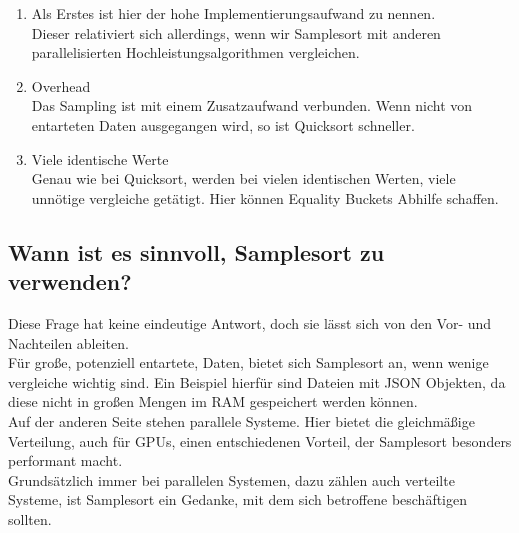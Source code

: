 		\begin{enumerate}
			\item Als Erstes ist hier der hohe Implementierungsaufwand zu nennen.\\
				Dieser relativiert sich allerdings, wenn wir Samplesort mit anderen parallelisierten Hochleistungsalgorithmen vergleichen.
			\item Overhead\\
				Das Sampling ist mit einem Zusatzaufwand verbunden.
				Wenn nicht von entarteten Daten ausgegangen wird, so ist Quicksort schneller.
			\item Viele identische Werte\\
				Genau wie bei Quicksort, werden bei vielen identischen Werten, viele unnötige vergleiche getätigt.
				Hier können Equality Buckets Abhilfe schaffen.
		\end{enumerate}
		
	\subsection{Wann ist es sinnvoll, Samplesort zu verwenden?}
		Diese Frage hat keine eindeutige Antwort, doch sie lässt sich von den Vor- und Nachteilen ableiten.\\
		Für große, potenziell entartete, Daten, bietet sich Samplesort an, wenn wenige vergleiche wichtig sind.
		Ein Beispiel hierfür sind Dateien mit JSON Objekten, da diese nicht in großen Mengen im RAM gespeichert werden können.\\
		Auf der anderen Seite stehen parallele Systeme. Hier bietet die gleichmäßige Verteilung, auch für GPUs, einen entschiedenen Vorteil, der Samplesort besonders performant macht.\\
		Grundsätzlich immer bei parallelen Systemen, dazu zählen auch verteilte Systeme, ist Samplesort ein Gedanke, mit dem sich betroffene beschäftigen sollten.
